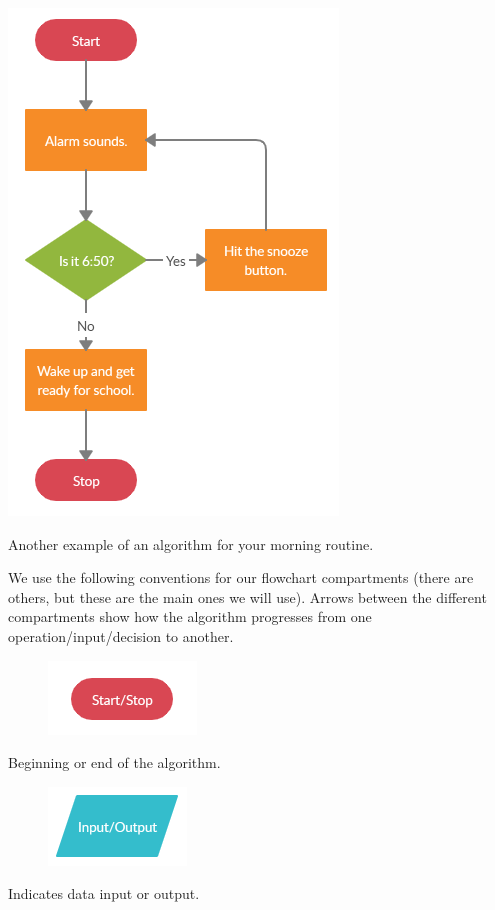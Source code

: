 \documentclass{ximera}
\begin{document}
\begin{image}
	\includegraphics{morning2.png}
\end{image}
\begin{center}
	Another example of an algorithm for your morning routine.
\end{center}

We use the following conventions for our flowchart compartments (there are others, but these are the main ones we will use). Arrows between the different compartments show how the algorithm progresses from one operation/input/decision to another.

\begin{figure}
	\includegraphics{startstop.png}
\end{figure}
\begin{center}
	Beginning or end of the algorithm.
\end{center}

\begin{figure}
	\includegraphics{io.png}
\end{figure}
\begin{center}
	Indicates data input or output.
\end{center}
\end{document}
